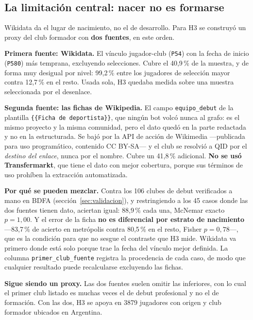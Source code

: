 \documentclass[11pt,a4paper]{article}
\begin{document}
\subsection{La limitación central: nacer no es formarse}

Wikidata da el lugar de nacimiento, no el de desarrollo. Para H3 se construyó un
proxy del club formador con \textbf{dos fuentes}, en este orden.

\textbf{Primera fuente: Wikidata.} El vínculo jugador-club (\texttt{P54}) con la
fecha de inicio (\texttt{P580}) más temprana, excluyendo selecciones. Cubre el
40,9\,\% de la muestra, y de forma muy desigual por nivel: 99,2\,\% entre los
jugadores de selección mayor contra 12,7\,\% en el resto. Usada sola, H3 quedaba
medida sobre una muestra seleccionada por el desenlace.

\label{sec:fichas}\textbf{Segunda fuente: las fichas de Wikipedia.} El campo
\texttt{equipo\_debut} de la plantilla \texttt{\{\{Ficha de deportista\}\}}, que
ningún bot volcó nunca al grafo: es el mismo proyecto y la misma comunidad, pero
el dato quedó en la parte redactada y no en la estructurada. Se bajó por la API
de acción de Wikimedia —publicada para uso programático, contenido CC BY-SA— y
el club se resolvió a QID por el \emph{destino del enlace}, nunca por el nombre.
Cubre un 41,8\,\% adicional. \textbf{No se usó Transfermarkt}, que tiene el dato
con mejor cobertura, porque sus términos de uso prohíben la extracción
automatizada.

\textbf{Por qué se pueden mezclar.} Contra los \num{106} clubes de debut
verificados a mano en BDFA (sección~\ref{sec:validacion}), y restringiendo a los
\num{45} casos donde las dos fuentes tienen dato, aciertan igual: 88,9\,\% cada
una, McNemar exacto $p = 1{,}00$. Y el error de la ficha \textbf{no es
diferencial por estrato de nacimiento} —83,7\,\% de acierto en metrópolis contra
80,5\,\% en el resto, Fisher $p = 0{,}78$—, que es la condición para que no
sesgue el contraste que H3 mide. Wikidata va primero donde está solo porque
trae la fecha del vínculo mejor definida. La columna
\texttt{primer\_club\_fuente} registra la procedencia de cada caso, de modo que
cualquier resultado puede recalcularse excluyendo las fichas.

\textbf{Sigue siendo un proxy.} Las dos fuentes suelen omitir las inferiores,
con lo cual el primer club listado es muchas veces el de debut profesional y no
el de formación. Con las dos, H3 se apoya en \num{3879} jugadores con origen y
club formador ubicados en Argentina.
\end{document}
